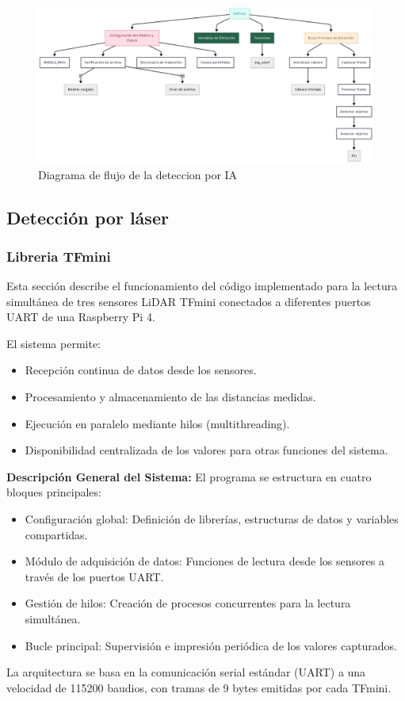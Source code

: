 \documentclass[12pt,a4paper]{article}
\begin{document}
\begin{figure}[H]
\noindent\hspace*{-0.7in}%
\includegraphics[width=1.2\linewidth]{Carpeta tecnica/diagramaflujoia1.jpg}
\caption{Diagrama de flujo de la deteccion por IA}
\end{figure}

\subsection{Detección por láser}
\subsubsection{Libreria TFmini}
Esta sección describe el funcionamiento del código implementado para la lectura simultánea de tres sensores LiDAR TFmini conectados a diferentes puertos UART de una Raspberry Pi 4.

El sistema permite:
\begin{itemize}
\item Recepción continua de datos desde los sensores.
\item Procesamiento y almacenamiento de las distancias medidas.
\item Ejecución en paralelo mediante hilos (multithreading).
\item Disponibilidad centralizada de los valores para otras funciones del sistema.
\end{itemize}

\textbf{Descripción General del Sistema:}
El programa se estructura en cuatro bloques principales:
\begin{itemize}
\item Configuración global: Definición de librerías, estructuras de datos y variables compartidas.
\item Módulo de adquisición de datos: Funciones de lectura desde los sensores a través de los puertos UART.
\item Gestión de hilos: Creación de procesos concurrentes para la lectura simultánea.
\item Bucle principal: Supervisión e impresión periódica de los valores capturados.
\end{itemize}
La arquitectura se basa en la comunicación serial estándar (UART) a una velocidad de 115200 baudios, con tramas de 9 bytes emitidas por cada TFmini.
\end{document}
